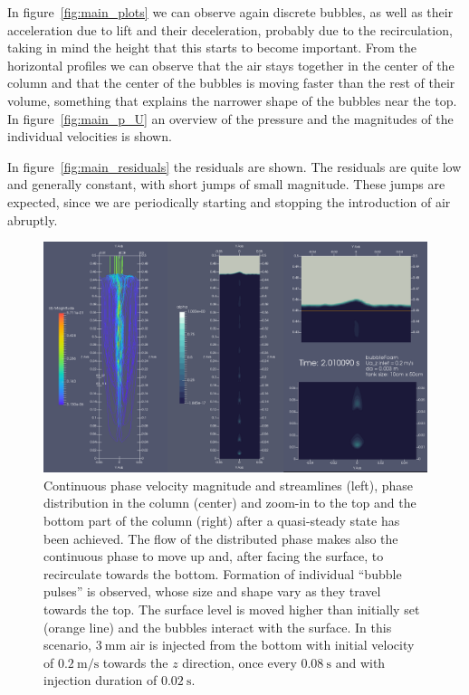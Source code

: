 \documentclass[11pt, a4paper, twoside]{article}
\begin{document}
In figure~\ref{fig:main_plots} we can observe again discrete bubbles, as well as their acceleration due to lift and their deceleration, probably due to the recirculation, taking in mind the height that this starts to become important. From the horizontal profiles we can observe that the air stays together in the center of the column and that the center of the bubbles is moving faster than the rest of their volume, something that explains the narrower shape of the bubbles near the top. In figure~\ref{fig:main_p_U} an overview of the pressure and the magnitudes of the individual velocities is shown.

In figure~\ref{fig:main_residuals} the residuals are shown. The residuals are quite low and generally constant, with short jumps of small magnitude. These jumps are expected, since we are periodically starting and stopping the introduction of air abruptly.

\begin{figure}
    \centering
    \includegraphics[width=\textwidth]{figures/main/column_streamlines_zoom_da3_Ua02}
    \caption{Continuous phase velocity magnitude and streamlines (left), phase distribution in the column (center) and zoom-in to the top and the bottom part of the column (right) after a quasi-steady state has been achieved. The flow of the distributed phase makes also the continuous phase to move up and, after facing the surface, to recirculate towards the bottom. Formation of individual ``bubble pulses'' is observed, whose size and shape vary as they travel towards the top. The surface level is moved higher than initially set (orange line) and the bubbles interact with the surface. In this scenario, $\SI{3}{\milli\metre}$ air is injected from the bottom with initial velocity of $\SI{0.2}{\metre/\second}$ towards the $z$ direction, once every $\SI{0.08}{\second}$ and with injection duration of $\SI{0.02}{\second}$.}
    \label{fig:main_overview}
\end{figure}
\end{document}
